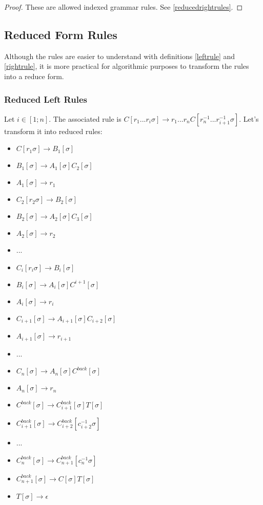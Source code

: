 \documentclass[10pt,a4paper,draft]{article}
\begin{document}
\begin{proof}
These are allowed indexed grammar rules. See \ref{reducedrightrules}.
\end{proof}

\subsection{Reduced Form Rules}

Although the rules are easier to understand with definitions \ref{leftrule} and \ref{rightrule}, it is more practical for algorithmic purposes to transform the rules into a reduce form.

\subsubsection{Reduced Left Rules}
\label{reducedleftrules}

Let $i \in [1; n]$. The associated rule is $C[r_1...r_i \sigma] \rightarrow r_1 ... r_n C[r_n^{-1}...r_{i+1}^{-1} \sigma]$. Let's transform it into reduced rules:
\begin{itemize}
\item $C[r_1 \sigma] \rightarrow B_1[\sigma]$
\item $B_1[\sigma] \rightarrow A_1[\sigma] C_2[\sigma]$
\item $A_1[\sigma] \rightarrow r_1$
\item $C_2[r_2 \sigma] \rightarrow B_2[\sigma]$
\item $B_2[\sigma] \rightarrow A_2[\sigma] C_3[\sigma]$
\item $A_2[\sigma] \rightarrow r_2$
\item ...
\item $C_i[r_i \sigma] \rightarrow B_i[\sigma]$
\item $B_i[\sigma] \rightarrow A_i[\sigma] C^{i+1}[\sigma]$
\item $A_i[\sigma] \rightarrow r_i$
\item $C_{i+1}[\sigma] \rightarrow A_{i+1}[\sigma] C_{i+2}[\sigma]$
\item $A_{i+1}[\sigma] \rightarrow r_{i+1}$
\item ...
\item $C_n[\sigma] \rightarrow A_n[\sigma] C^{back}[\sigma]$
\item $A_n[\sigma] \rightarrow r_n$
\item $C^{back}[\sigma] \rightarrow C^{back}_{i+1}[\sigma] T[\sigma]$
\item $C_{i+1}^{back}[\sigma] \rightarrow C^{back}_{i+2}[c^{-1}_{i+2} \sigma]$
\item ...
\item $C_{n}^{back}[\sigma] \rightarrow C^{back}_{n+1}[c^{-1}_{n} \sigma]$
\item $C^{back}_{n+1}[\sigma] \rightarrow C[\sigma] T[\sigma]$
\item $T[\sigma] \rightarrow \epsilon$
\end{itemize}
\end{document}
